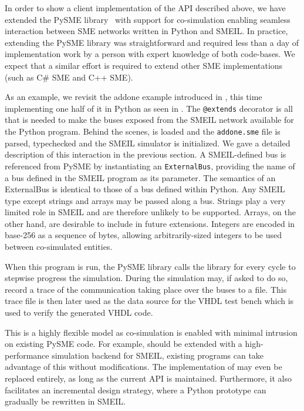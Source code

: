 In order to show a client implementation of the API described above, we have
extended the PySME library~\cite{pysme} with support for co-simulation enabling
seamless interaction between SME networks written in Python and SMEIL. In
practice, extending the PySME library was straightforward and required less than
a day of implementation work by a person with expert knowledge of both
code-bases. We expect that a similar effort is required to extend other SME
implementations (such as C\# SME and C++ SME).

As an example, we revisit the {\sc addone} example introduced in ,
this time implementing one half of it in Python as seen in
. The \texttt{@extends} decorator is all that is needed to
make the buses exposed from the SMEIL network available for the Python
program. Behind the scenes, \libsme{} is loaded and the \texttt{addone.sme} file
is parsed, typechecked and the \libsme{} SMEIL simulator is initialized. We gave
a detailed description of this interaction in the previous section. A
SMEIL-defined bus is referenced from PySME by instantiating an
\texttt{ExternalBus}, providing the name of a bus defined in the SMEIL program
as its parameter. The semantics of an {\ttfamily ExternalBus} is identical to
those of a bus defined within Python. Any SMEIL type except strings and arrays
may be passed along a bus. Strings play a very limited role in SMEIL and are
therefore unlikely to be supported. Arrays, on the other hand, are desirable to
include in future extensions. Integers are encoded in base-256 as a sequence of
bytes, allowing arbitrarily-sized integers to be used between co-simulated
entities.

When this program is run, the PySME library calls the \libsme{} library for
every cycle to stepwise progress the simulation. During the simulation \libsme{}
may, if asked to do so, record a trace of the communication taking place over
the buses to a file. This trace file is then later used as the data source for
the VHDL test bench which is used to verify the generated VHDL code.

This is a highly flexible model as co-simulation is enabled with minimal
intrusion on existing PySME code. For example, should \libsme{} be extended with
a high-performance simulation backend for SMEIL, existing programs can take
advantage of this without modifications. The implementation of \libsme{} may
even be replaced entirely, as long as the current API is
maintained. Furthermore, it also facilitates an incremental design strategy,
where a Python prototype can gradually be rewritten in SMEIL.

